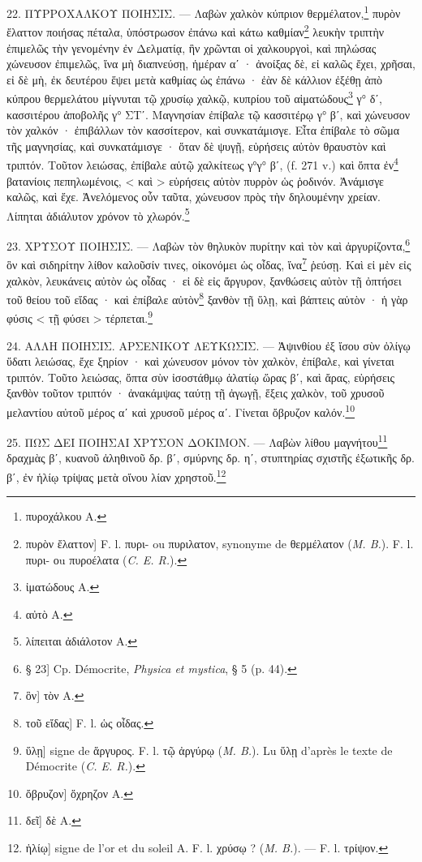 \documentclass[a4paper, 11pt, oneside, polutonikogreek, french]{article}
\begin{document}
22. ΠΥΡΡΟΧΑΛΚΟΥ ΠΟΙΗΣΙΣ. --- Λαβὼν χαλκὸν κύπριον θερμέλατον,\footnote{πυροχάλκου A.} πυρὸν ἔλαττον ποιήσας πέταλα, ὑπόστρωσον ἐπάνω καὶ κάτω καθμίαν\footnote{πυρὸν ἔλαττον] F. l. πυρι- ou πυριλατον, synonyme de θερμέλατον (\emph{M. B.}). F. l. πυρι- οu πυροέλατα (\emph{C. E. R.}).} λευκὴν τριπτὴν ἐπιμελῶς τὴν γενομένην ἐν Δελματίᾳ, ἣν χρῶνται οἱ χαλκουργοὶ, καὶ πηλώσας χώνευσον ἐπιμελῶς, ἵνα μὴ διαπνεύσῃ, ἡμέραν αʹ · ἀνοίξας δὲ, εἰ καλῶς ἔχει, χρῆσαι, εἰ δὲ μὴ, ἐκ δευτέρου ἕψει μετὰ καθμίας ὡς ἐπάνω · ἐὰν δὲ κάλλιον ἐξέθῃ ἀπὸ κύπρου θερμελάτου μίγνυται τῷ χρυσίῳ χαλκῷ, κυπρίου τοῦ αἱματώδους\footnote{ἰματώδους A.} γ° δʹ, κασσιτέρου ἀποβολῆς γ° ΣΤʹ. Μαγνησίαν ἐπίβαλε τῷ κασσιτέρῳ γ° βʹ, καὶ χώνευσον τὸν χαλκόν · ἐπιβάλλων τὸν κασσίτερον, καὶ συνκατάμισγε. Εἶτα ἐπίβαλε τὸ σῶμα τῆς μαγνησίας, καὶ συνκατάμισγε · ὅταν δὲ ψυγῇ, εὑρήσεις αὐτὸν θραυστὸν καὶ τριπτόν. Τοῦτον λειώσας, ἐπίβαλε αὐτῷ χαλκίτεως γ°γ° βʹ, (f. 271 v.) καὶ ὄπτα ἐν\footnote{αὐτὸ A.} βατανίοις πεπηλωμένοις, < καὶ > εὑρήσεις αὐτὸν πυρρὸν ὡς ῥοδινόν. Ἀνάμισγε καλῶς, καὶ ἔχε. Ἀνελόμενος οὖν ταῦτα, χώνευσον πρὸς τὴν δηλουμένην χρείαν. Λίπηται ἀδιάλυτον χρόνον τὸ χλωρόν.\footnote{λίπειται ἀδιάλοτον A.}

23. ΧΡΥΣΟΥ ΠΟΙΗΣΙΣ. --- Λαβὼν τὸν θηλυκὸν πυρίτην καὶ τὸν καὶ ἀργυρίζοντα,\footnote{§ 23] Cp. Démocrite, \emph{Physica et mystica}, § 5 (p. 44).} ὃν καὶ σιδηρίτην λίθον καλοῦσίν τινες, οἰκονόμει ὡς οἶδας, ἵνα\footnote{ὃν] τὸν A.} ῥεύσῃ. Καὶ εἰ μὲν εἰς χαλκὸν, λευκάνεις αὐτὸν ὡς οἶδας · εἰ δὲ εἰς ἄργυρον, ξανθώσεις αὐτὸν τῇ ὀπτήσει τοῦ θείου τοῦ εἴδας · καὶ ἐπίβαλε αὐτὸν\footnote{τοῦ εἴδας] F. l. ὡς οἶδας.} ξανθὸν τῇ ὕλῃ, καὶ βάπτεις αὐτὸν · ἡ γὰρ φύσις < τῇ φύσει > τέρπεται.\footnote{ὕλῃ] signe de ἅργυρος. F. l. τῷ ἀργύρῳ (\emph{M. B.}). Lu ὕλῃ d'après le texte de Démocrite (\emph{C. E. R.}).}

24. ΑΛΛΗ ΠΟΙΗΣΙΣ. ΑΡΣΕΝΙΚΟΥ ΛΕΥΚΩΣΙΣ. --- Ἀψινθίου ἐξ ἴσου σὺν ὀλίγῳ ὕδατι λειώσας, ἔχε ξηρίον · καὶ χώνευσον μόνον τὸν χαλκὸν, ἐπίβαλε, καὶ γίνεται τριπτόν. Τοῦτο λειώσας, ὄπτα σὺν ἰσοστάθμῳ ἁλατίῳ ὥρας βʹ, καὶ ἄρας, εὑρήσεις ξανθὸν τοῦτον τριπτόν · ἀνακάμψας ταύτῃ τῇ ἀγωγῇ, ἕξεις χαλκὸν, τοῦ χρυσοῦ μελαντίου αὐτοῦ μέρος αʹ καὶ χρυσοῦ μέρος αʹ. Γίνεται ὄβρυζον καλόν.\footnote{ὄβρυζον] ὅχρηζον A.}

25. ΠΩΣ ΔΕΙ ΠΟΙΗΣΑΙ ΧΡΥΣΟΝ ΔΟΚΙΜΟΝ. --- Λαβὼν λίθου μαγνήτου\footnote{δεῖ] δὲ A.} δραχμὰς βʹ, κυανοῦ ἀληθινοῦ δρ. βʹ, σμύρνης δρ. ηʹ, στυπτηρίας σχιστῆς ἐξωτικῆς δρ. βʹ, ἐν ἡλίῳ τρίψας μετὰ οἴνου λίαν χρηστοῦ.\footnote{ἡλίῳ] signe de l'or et du soleil A. F. l. χρύσῳ ? (\emph{M. B.}). --- F. l. τρίψον.}
\end{document}
